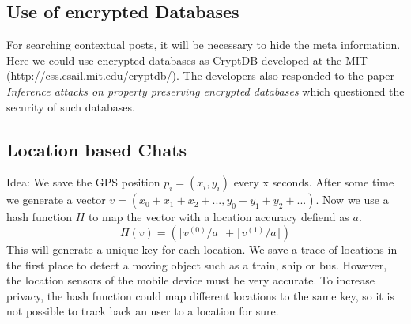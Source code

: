 \documentclass{scrartcl}
\begin{document}
\subsection{Use of encrypted Databases}
For searching contextual posts, it will be necessary to hide the meta information. Here we could use encrypted databases as CryptDB developed at the MIT (\url{http://css.csail.mit.edu/cryptdb/}). The developers also responded to the paper  \emph{Inference attacks on property preserving encrypted databases} \cite{INF} which questioned the security of such databases.


  \subsection{Location based Chats}
  Idea: We save the GPS position $p_i = (x_i,y_i)$  every x seconds. After some time
  we generate a vector $v = (x_0+x_1+x_2+..., y_0+y_1+y_2+...)$. Now we use a hash function $H$ to map the vector with a location accuracy defiend as $a$. 
  $$
  H(v) = (\lceil v^{(0)}/a \rceil +\lceil v^{(1)}/a \rceil )
  $$
  This will generate a unique key for each location. We save a trace of locations in the first place to detect a moving object such as a train, ship or bus.  However, the location sensors of the mobile device must be very accurate. To increase privacy, the hash function could map different locations to the same key, so it is not possible to track back an user to a location for sure.
  
  
  
\end{document}

